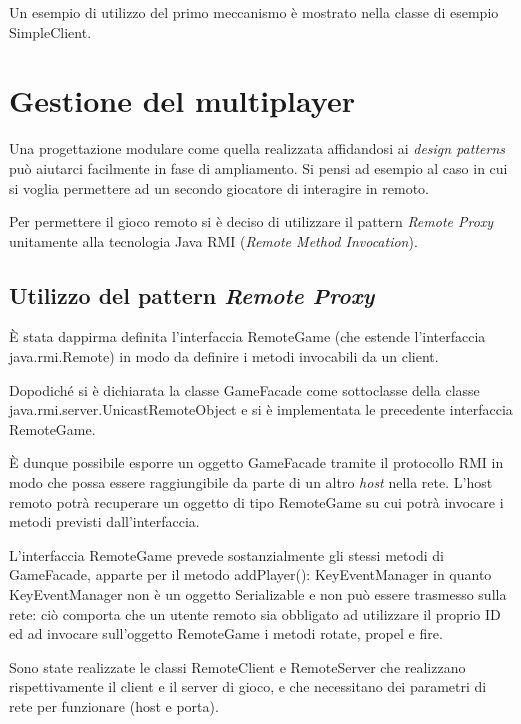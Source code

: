 \documentclass[a4paper,12pt]{article}
\begin{document}
Un esempio di utilizzo del primo meccanismo \`e mostrato nella classe di esempio \textsf{SimpleClient}.

\section{Gestione del multiplayer}
\label{sec:multiplayer}

Una progettazione modulare come quella realizzata affidandosi ai \emph{design patterns} pu\`o aiutarci facilmente in fase di ampliamento. Si pensi ad esempio al caso in cui si voglia permettere ad un secondo giocatore di interagire in remoto.

Per permettere il gioco remoto si \`e deciso di utilizzare il pattern \emph{Remote Proxy} unitamente alla tecnologia Java RMI (\emph{Remote Method Invocation}).

\subsection{Utilizzo del pattern \emph{Remote Proxy}}

\`E stata dappirma definita l'interfaccia \textsf{RemoteGame} (che estende l'interfaccia \textsf{java.rmi.Remote}) in modo da definire i metodi invocabili da un client.

Dopodich\'e si \`e dichiarata la classe  \textsf{GameFacade} come sottoclasse della classe  \textsf{java.rmi.server.UnicastRemoteObject} e si \`e implementata le precedente interfaccia
\textsf{RemoteGame}.

\`E dunque possibile esporre un oggetto \textsf{GameFacade} tramite il protocollo RMI in modo che possa essere raggiungibile da parte di un altro \emph{host} nella rete. L'host remoto potr\`a recuperare un oggetto di tipo \textsf{RemoteGame} su cui potr\`a invocare i metodi previsti dall'interfaccia.

L'interfaccia \textsf{RemoteGame} prevede sostanzialmente gli stessi metodi di \textsf{GameFacade}, apparte per il metodo \textsf{addPlayer(): KeyEventManager} in quanto \textsf{KeyEventManager} non \`e un oggetto \textsf{Serializable} e non pu\`o essere trasmesso sulla rete: ci\`o comporta che un utente remoto sia obbligato ad utilizzare il proprio ID ed ad invocare sull'oggetto \textsf{RemoteGame} i metodi \textsf{rotate}, \textsf{propel} e \textsf{fire}.

Sono state realizzate le classi \textsf{RemoteClient} e \textsf{RemoteServer} che realizzano rispettivamente il client e il server di gioco, e che necessitano dei parametri di rete per funzionare (host e porta).
\end{document}
